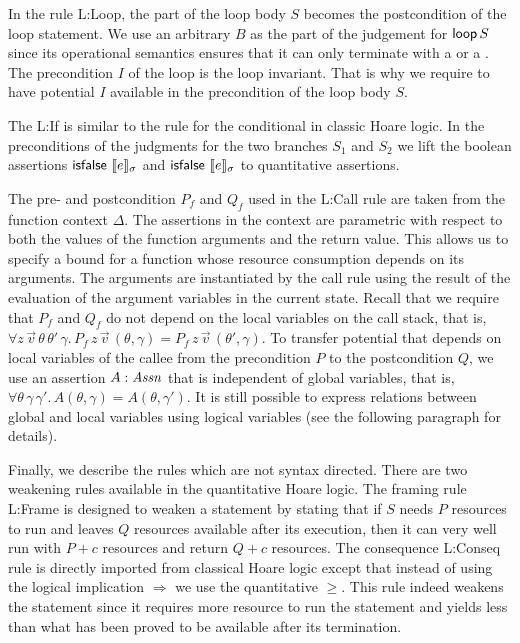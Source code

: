 \documentclass[nocopyrightspace,preprint,pldi]{sigplanconf-pldi15}
\begin{document}
{In the rule {\sc L:Loop}, the  part of the
loop body $S$ becomes the postcondition of the loop statement. We use
an arbitrary $B$ as the  part of the judgement for
$\mathsf{loop}\, S$ since its operational semantics ensures that it can
only terminate with a  or a .  The
precondition $I$ of the loop is the loop invariant.  That is why we
require to have potential $I$ available in the precondition of the
loop body $S$.

The {\sc L:If} is similar to the rule for the conditional in classic
Hoare logic.  In the preconditions of the judgments for the two
branches $S_1$ and $S_2$ we lift the boolean assertions
$\mathsf{isfalse}~\llbracket e \rrbracket_{\sigma}$ and $\mathsf{isfalse}~\llbracket e \rrbracket_{\sigma}$ to
quantitative assertions.

The pre- and postcondition $P_f$ and $Q_f$ used in the {\sc L:Call} rule
are taken from the function context $\Delta$.  The assertions in
the context are parametric with respect to both the values of the
function arguments and the return value. This allows us to specify a
bound for a function whose resource consumption depends on its
arguments.  The arguments are instantiated by the call rule
using the result of the evaluation of the argument variables in the
current state.  Recall that we require that $P_f$ and $Q_f$ do
  not depend on the local variables on the call stack, that is,
  $\forall z \, \vec v \, \theta \, \theta' \, \gamma . \, P_f \, z \,
  \vec v \, (\theta,\gamma) = P_f \, z \, \vec v \,
  (\theta',\gamma)$. To transfer potential that depends on local
variables of the callee from the precondition $P$ to the postcondition
$Q$, we use an assertion $A : \mathit{Assn}$ that is independent of global
variables, that is, $\forall \theta \, \gamma \, \gamma' . \, A
(\theta,\gamma) = A(\theta,\gamma')$.  It is still possible to express
relations between global and local variables using logical
variables (see the following paragraph for details).

Finally, we describe the rules which are not syntax directed.  There
are two weakening rules available in the quantitative Hoare logic.
The framing rule {\sc L:Frame} is designed to weaken a statement by
stating that if $S$ needs $P$ resources to run and leaves $Q$
resources available after its execution, then it can very well run
with $P + c$ resources and return $Q + c$ resources.  The consequence
{\sc L:Conseq} rule is directly imported from classical Hoare logic
except that instead of using the logical implication $\Rightarrow$ we
use the quantitative $\ge$.  This rule indeed weakens the statement
since it requires more resource to run the statement and yields less
than what has been proved to be available after its termination.

}
\end{document}
